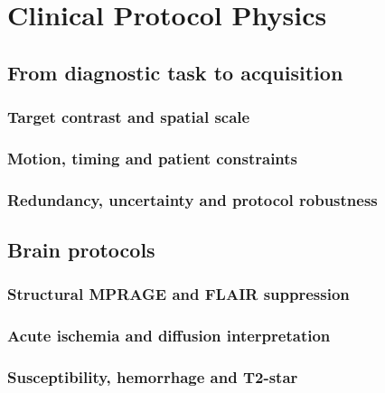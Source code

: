 \chapter{Clinical Protocol Physics}
\label{ch:23}

\section{From diagnostic task to acquisition}
\label{sec:23:from-diagnostic-task-to-acquisition}
\subsection{Target contrast and spatial scale}
\subsection{Motion, timing and patient constraints}
\subsection{Redundancy, uncertainty and protocol robustness}

\section{Brain protocols}
\label{sec:23:brain-protocols}
\subsection{Structural MPRAGE and FLAIR suppression}
\subsection{Acute ischemia and diffusion interpretation}
\subsection{Susceptibility, hemorrhage and T2-star}

